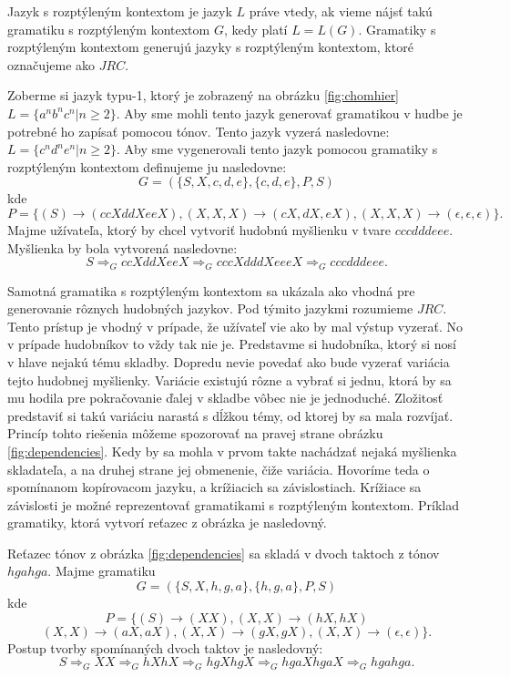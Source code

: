 Jazyk s rozptýleným kontextom je jazyk $L$ práve vtedy, ak vieme nájsť takú gramatiku s rozptýleným kontextom $G$, kedy platí $L = L(G)$. Gramatiky s rozptýleným kontextom generujú jazyky s rozptýleným kontextom, ktoré označujeme ako $JRC$.

\begin{example}
    Zoberme si jazyk typu-1, ktorý je zobrazený na obrázku \ref{fig:chomhier} \\ $L = \{a^n b^n c^n| n \geq 2\}$. Aby sme mohli tento jazyk generovať gramatikou v hudbe je potrebné ho zapísať pomocou tónov. Tento jazyk vyzerá nasledovne: $L = \{c^n d^n e^n| n \geq 2\}$. Aby sme vygenerovali tento jazyk pomocou gramatiky s rozptýleným kontextom definujeme ju nasledovne: $$ G = (\{S, X, c, d, e\}, \{c,d,e\}, P, S)$$ kde $$P = \{(S) \rightarrow (ccXddXeeX), (X,X,X) \rightarrow (cX, dX, eX), (X,X,X) \rightarrow (\epsilon, \epsilon, \epsilon)\}.$$
    Majme užívateľa, ktorý by chcel vytvoriť hudobnú myšlienku v tvare $cccdddeee$. Myšlienka by bola vytvorená nasledovne: $$ S \Rightarrow_G  ccXddXeeX \Rightarrow_G cccXdddXeeeX \Rightarrow_G cccdddeee.$$
\end{example}

Samotná gramatika s rozptýleným kontextom sa ukázala ako vhodná pre generovanie rôznych hudobných jazykov. Pod týmito jazykmi rozumieme $JRC$. Tento prístup je vhodný v prípade, že užívateľ vie ako by mal výstup vyzerať. No v prípade hudobníkov to vždy tak nie je. Predstavme si hudobníka, ktorý si nosí v hlave nejakú tému skladby. Dopredu nevie povedať ako bude vyzerať variácia tejto hudobnej myšlienky. Variácie existujú rôzne a vybrať si jednu, ktorá by sa mu hodila pre pokračovanie ďalej v skladbe vôbec nie je jednoduché. Zložitosť predstaviť si takú variáciu narastá s dĺžkou témy, od ktorej by sa mala rozvíjať. Princíp tohto riešenia môžeme spozorovať na pravej strane obrázku \ref{fig:dependencies}. Kedy by sa mohla v prvom takte nachádzať nejaká myšlienka skladateľa, a na druhej strane jej obmenenie, čiže variácia. Hovoríme teda o spomínanom kopírovacom jazyku, a krížiacich sa závislostiach. Krížiace sa závislosti je možné reprezentovať gramatikami s rozptýleným kontextom. Príklad gramatiky, ktorá vytvorí reťazec z obrázka je nasledovný.

\begin{example}
\label{variation}
Reťazec tónov z obrázka \ref{fig:dependencies} sa skladá v dvoch taktoch z tónov $hgahga$. Majme gramatiku $$G = (\{S,X,h,g,a\}, \{h,g,a\}, P, S)$$ kde $$P = \{(S) \rightarrow (XX), (X,X) \rightarrow (hX,hX)$$ $$(X,X) \rightarrow (aX,aX), (X,X) \rightarrow (gX,gX), (X,X) \rightarrow (\epsilon, \epsilon)\}.$$ Postup tvorby spomínaných dvoch taktov je nasledovný: $$S \Rightarrow_G XX \Rightarrow_G hXhX \Rightarrow_G hgXhgX \Rightarrow_G hgaXhgaX \Rightarrow_G hgahga.$$
\end{example}

